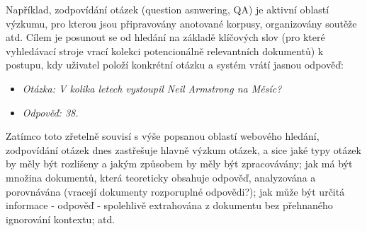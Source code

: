 \begin{multicols}{2}
Například, zodpovídání otázek (question asnwering, QA) je aktivní oblastí výzkumu, pro kterou jsou připravovány anotované korpusy, organizovány soutěže atd. Cílem je posunout se od hledání na základě klíčových slov (pro které vyhledávací stroje vrací kolekci potencionálně relevantních dokumentů) k postupu, kdy uživatel položí konkrétní otázku a systém vrátí jasnou odpověď:\\
\begin{itemize}
\item[] \textit{Otázka: V kolika letech vystoupil Neil Armstrong na Měsíc?}
\item[] \textit{Odpověď: 38.}
\end{itemize}
Zatímco toto zřetelně souvisí s výše popsanou oblastí webového hledání, zodpovídání otázek dnes zastřešuje hlavně výzkum otázek, a sice jaké typy otázek by měly být rozlišeny a jakým způsobem by měly být zpracovávány; jak má být množina dokumentů, která teoreticky obsahuje odpověď, analyzována a porovnávána (vracejí dokumenty rozporuplné odpovědi?); jak může být určitá informace - odpověď - spolehlivě extrahována z dokumentu bez přehnaného ignorování kontextu; atd.


\end{multicols}
